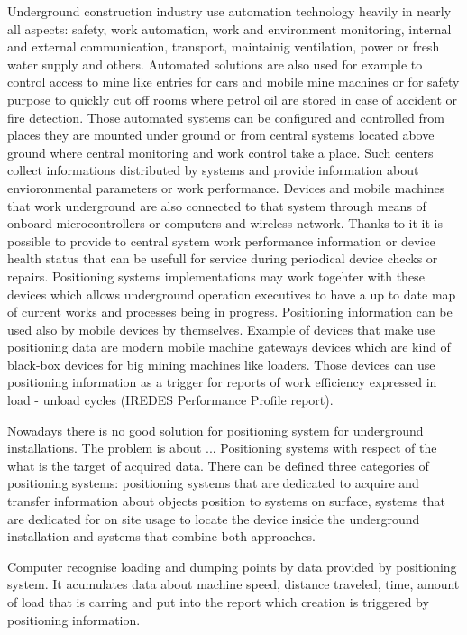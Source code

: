 \documentclass[../main.tex]{subfiles}
\begin{document}
Underground construction industry use automation technology heavily in nearly all aspects: safety, work automation, work and environment monitoring, internal and external communication, transport, maintainig ventilation, power or fresh water supply and others. Automated solutions are also used for example to control access to mine like entries for cars and mobile mine machines or for safety purpose to quickly cut off rooms where petrol oil are stored in case of accident or fire detection. Those automated systems can be configured and controlled from places they are mounted under ground or from central systems located above ground where central monitoring and work control take a place. Such centers collect informations distributed by systems and provide information about envioronmental parameters or work performance. Devices and mobile machines that work underground are also connected to that system through means of onboard microcontrollers or computers and wireless network. Thanks to it it is possible to provide to central system work performance information or device health status that can be usefull for service during periodical device checks or repairs. Positioning systems implementations may work togehter with these devices which allows underground operation executives to have a up to date map of current works and processes being in progress. Positioning information can be used also by mobile devices by themselves. Example of devices that make use positioning data are modern mobile machine gateways devices \cite{Thesis_CM} which are kind of black-box devices for big mining machines like loaders. Those devices can use positioning information as a trigger for reports of work efficiency expressed in load - unload cycles (IREDES Performance Profile report).

Nowadays there is no good solution for positioning system for underground installations. The problem is about ... Positioning systems with respect of the what is the target of acquired data. There can be defined three categories of positioning systems: positioning systems that are dedicated to acquire and transfer information about objects position to systems on surface, systems that are dedicated for on site usage to locate the device inside the underground installation and systems that combine both approaches.


Computer recognise loading and dumping points by data provided by positioning system. It acumulates data about machine speed, distance traveled, time, amount of load that is carring and put into the report which creation is triggered by positioning information.
\end{document}
